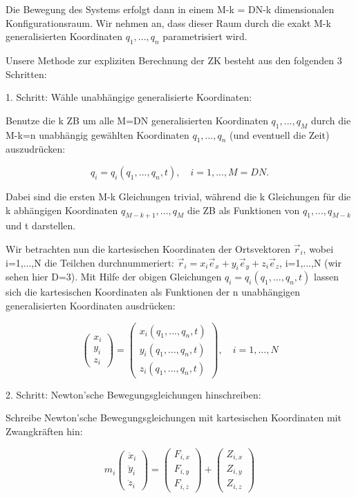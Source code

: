 \documentclass[10pt, letterpaper]{article}
\begin{document}
Die Bewegung des Systems erfolgt dann in einem M-k = DN-k dimensionalen Konfigurationsraum. Wir nehmen an, dass dieser Raum durch die exakt M-k generalisierten Koordinaten $q_1,...,q_n$ parametrisiert wird.



Unsere Methode zur expliziten Berechnung der ZK besteht aus den folgenden 3 Schritten:


1. Schritt: Wähle unabhängige generalisierte Koordinaten:

Benutze die k ZB um alle M=DN generalisierten Koordinaten $q_1,...,q_M$ durch die M-k=n unabhängig gewählten Koordinaten $q_1,...,q_n$ (und eventuell die Zeit) auszudrücken:

\[q_i = q_i(q_1,...,q_n,t), \quad i=1,...,M=DN.\]

Dabei sind die ersten M-k Gleichungen trivial, während die k Gleichungen für die k abhängigen Koordinaten $q_{M-k+1},...,q_M$ die ZB als Funktionen von $q_1,...,q_{M-k}$ und t darstellen.

Wir betrachten nun die kartesischen Koordinaten der Ortsvektoren $\vec{r}_i$, wobei i=1,...,N die Teilchen durchnummeriert: $\vec{r}_i = x_i \vec{e}_x + y_i \vec{e}_y + z_i \vec{e}_z$, i=1,...,N (wir sehen hier D=3). Mit Hilfe der obigen Gleichungen $q_i = q_i(q_1,...,q_n,t)$ lassen sich die kartesischen Koordinaten als Funktionen der n unabhängigen generalisierten Koordinaten ausdrücken:

\[\begin{pmatrix} x_i \\ y_i \\ z_i \end{pmatrix} = \begin{pmatrix} x_i(q_1,...,q_n,t) \\ y_i(q_1,...,q_n,t) \\ z_i(q_1,...,q_n,t) \end{pmatrix}, \quad i=1,...,N\]


2. Schritt: Newton'sche Bewegungsgleichungen hinschreiben:

Schreibe Newton'sche Bewegungsgleichungen mit kartesischen Koordinaten mit Zwangkräften hin:

\[m_i\begin{pmatrix} \ddot{x}_i \\ \ddot{y}_i \\ \ddot{z}_i \end{pmatrix} = \begin{pmatrix} F_{i,x} \\ F_{i,y} \\ F_{i,z} \end{pmatrix} + \begin{pmatrix} Z_{i,x} \\ Z_{i,y} \\ Z_{i,z} \end{pmatrix}\]
\end{document}
